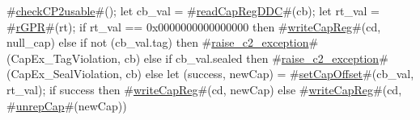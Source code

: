 #\hyperref[sailMIPSzcheckCP2usable]{checkCP2usable}#();
let cb_val = #\hyperref[sailMIPSzreadCapRegDDC]{readCapRegDDC}#(cb);
let rt_val = #\hyperref[sailMIPSzrGPR]{rGPR}#(rt);
if rt_val == 0x0000000000000000 then
  #\hyperref[sailMIPSzwriteCapReg]{writeCapReg}#(cd, null_cap)
else if not (cb_val.tag) then
  #\hyperref[sailMIPSzraisezyc2zyexception]{raise\_c2\_exception}#(CapEx_TagViolation, cb)
else if cb_val.sealed then
  #\hyperref[sailMIPSzraisezyc2zyexception]{raise\_c2\_exception}#(CapEx_SealViolation, cb)
else
{
  let (success, newCap) = #\hyperref[sailMIPSzsetCapOffset]{setCapOffset}#(cb_val, rt_val);
  if success then
      #\hyperref[sailMIPSzwriteCapReg]{writeCapReg}#(cd, newCap)
  else
      #\hyperref[sailMIPSzwriteCapReg]{writeCapReg}#(cd, #\hyperref[sailMIPSzunrepCap]{unrepCap}#(newCap))
}
